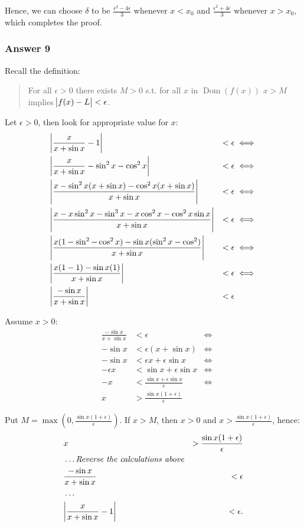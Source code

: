 \documentclass[a4paper]{article}
\DeclareMathOperator{\Dom}{Dom}
\begin{document}
Hence, we can choose $\delta$ to be $\frac{\epsilon^2 - 4\epsilon}{3}$
whenever $x < x_0$ and $\frac{\epsilon^2 + 4\epsilon}{3}$ whenever
$x > x_0$, which completes the proof.
\subsubsection{Answer 9}
\label{sec-1-3-2}
Recall the definition:
\begin{quote}
For all $\epsilon > 0$ there exists $M > 0$ s.t. for all $x$ in
$\Dom(f(x))$ $x > M$ implies $\abs{f(x) - L} < \epsilon$.
\end{quote}

Let $\epsilon > 0$, then look for appropriate value for $x$:
\begin{align*}
  &\abs{\frac{x}{x + \sin x} - 1}                   &< \epsilon &\iff \\
  &\abs{\frac{x}{x + \sin x} - \sin^2 x - \cos^2 x} &< \epsilon &\iff \\
  &\abs{\frac{x - \sin^2 x(x + \sin x) -
      \cos^2 x(x + \sin x)}{x + \sin x}}            &< \epsilon &\iff \\
  &\abs{\frac{x - x\sin^2 x - \sin^3 x -
      x\cos^2 x - \cos^2 x \sin x}{x + \sin x}}     &< \epsilon &\iff \\
  &\abs{\frac{x(1 - \sin^2 - \cos^2 x) -
      \sin x(\sin^2 x - \cos^2)}{x + \sin x}}       &< \epsilon &\iff \\
  &\abs{\frac{x(1 - 1) - \sin x(1)}{x + \sin x}}    &< \epsilon &\iff \\
  &\abs{\frac{-\sin x}{x + \sin x}}                 &< \epsilon \\
\end{align*}

Assume $x > 0$:
\begin{align*}
  &\frac{-\sin x}{x + \sin x} &< \epsilon &\iff \\
  &-\sin x                    &< \epsilon(x + \sin x) &\iff \\
  &-\sin x                    &< \epsilon x + \epsilon \sin x &\iff \\
  &-\epsilon x                &< \sin x + \epsilon \sin x &\iff \\
  &-x                         &< \frac{\sin x + \epsilon \sin x}{\epsilon} &\iff \\
  &x                          &> \frac{\sin x(1 + \epsilon)}{\epsilon}
\end{align*}

Put $M = \max\left(0, \frac{\sin x(1 + \epsilon)}{\epsilon}\right)$. If $x > M$, then
$x > 0$ and $x > \frac{\sin x(1 + \epsilon)}{\epsilon}$, hence:
\begin{align*}
  &x                              &> \frac{\sin x(1 + \epsilon)}{\epsilon} \\
  &\hdots \textit{Reverse the calculations above} \\
  &\frac{-\sin x}{x + \sin x}     &< \epsilon \\
  &\hdots \\
  &\abs{\frac{x}{x + \sin x} - 1} &< \epsilon.
\end{align*}
\end{document}
